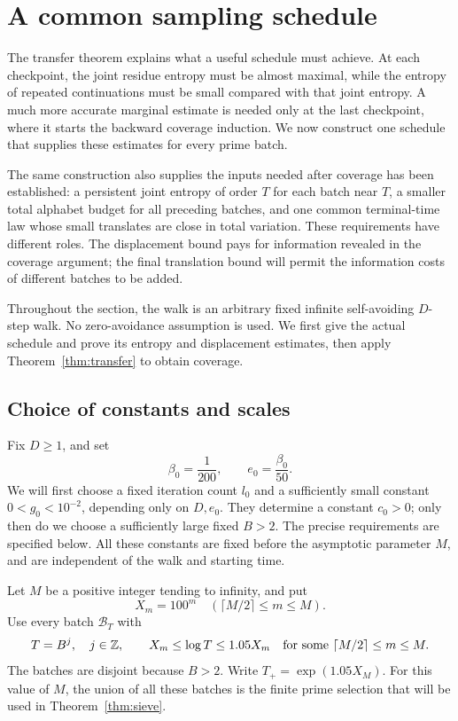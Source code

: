 \section{A common sampling schedule}\label{sec:schedule}

The transfer theorem explains what a useful schedule must achieve.
At each checkpoint, the joint residue entropy must be almost maximal,
while the entropy of repeated continuations must be small compared
with that joint entropy. A much more accurate marginal estimate is
needed only at the last checkpoint, where it starts the backward
coverage induction. We now construct one schedule that supplies these
estimates for every prime batch.

The same construction also supplies the inputs needed after coverage
has been established: a persistent joint entropy of order \(T\) for
each batch near \(T\), a smaller total alphabet budget for all preceding
batches, and one common terminal-time law whose small translates are
close in total variation. These requirements have different roles.
The displacement bound pays for information revealed in the coverage
argument; the final translation bound will permit the information costs
of different batches to be added.

Throughout the section, the walk is an arbitrary fixed infinite
self-avoiding \(D\)-step walk. No zero-avoidance assumption is used.
We first give the actual schedule and prove its entropy and displacement
estimates, then apply Theorem~\ref{thm:transfer} to obtain coverage.

\subsection{Choice of constants and scales}

Fix \(D\ge1\), and set
\[
\beta_0=\frac1{200},\qquad e_0=\frac{\beta_0}{50}.
\]
We will first choose a fixed iteration count \(l_0\) and a sufficiently
small constant \(0<g_0<10^{-2}\), depending only on \(D,e_0\).
They determine a constant \(c_0>0\); only then do we choose a sufficiently
large fixed \(B>2\). The precise requirements are specified below.
All these constants are fixed before the asymptotic parameter \(M\),
and are independent of the walk and starting time.

Let \(M\) be a positive integer tending to infinity, and put
\[
X_m=100^m\quad(\lceil M/2\rceil\le m\le M).
\]
Use every batch \(\mathcal B_T\) with
\begin{equation}\label{eq:batches}
T=B^j,\quad j\in\mathbb Z,\qquad
X_m\le\log T\le1.05X_m
\quad\text{for some }\lceil M/2\rceil\le m\le M.
\end{equation}
The batches are disjoint because \(B>2\).
Write \(T_+=\exp(1.05X_M)\).
For this value of \(M\), the union of all these batches is the finite
prime selection that will be used in Theorem~\ref{thm:sieve}.

